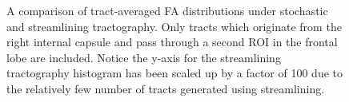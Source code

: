 \begin{figure}
  \caption{A comparison of tract-averaged FA distributions under stochastic and streamlining tractography.  Only tracts which originate from the right internal capsule and pass through a second ROI in the frontal lobe are included.  Notice the y-axis for the streamlining tractography histogram has been scaled up by a factor of 100 due to the relatively few number of tracts generated using streamlining.}
  \label{fig:streamlinecomphistFA}
\end{figure}

